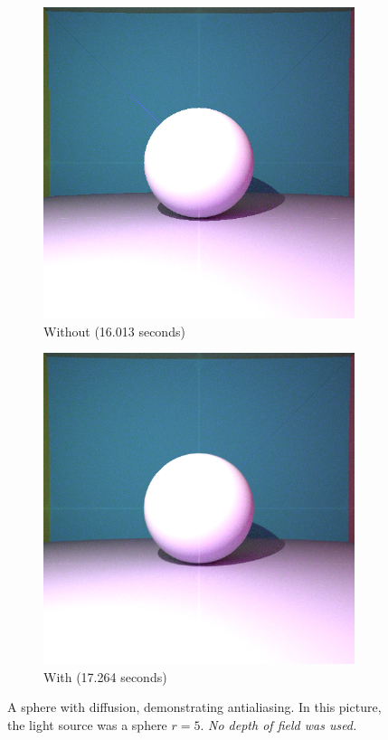 \documentclass{amsart}
\begin{document}
\begin{figure}
     \centering
     \begin{subfigure}[b]{0.7\textwidth}
         \centering
         \includegraphics[width=\textwidth]{img/fig4_1.png}
         \caption{Without (16.013 seconds)}
     \end{subfigure}
     \hfill
     \begin{subfigure}[b]{0.7\textwidth}
         \centering
         \includegraphics[width=\textwidth]{img/fig4_2.png}
         \caption{With (17.264 seconds)}
     \end{subfigure}
     \caption{A sphere with diffusion, demonstrating antialiasing. In this picture, the light source was a sphere $r = 5$. \emph{No depth of field was used.}}
\end{figure}
\end{document}
